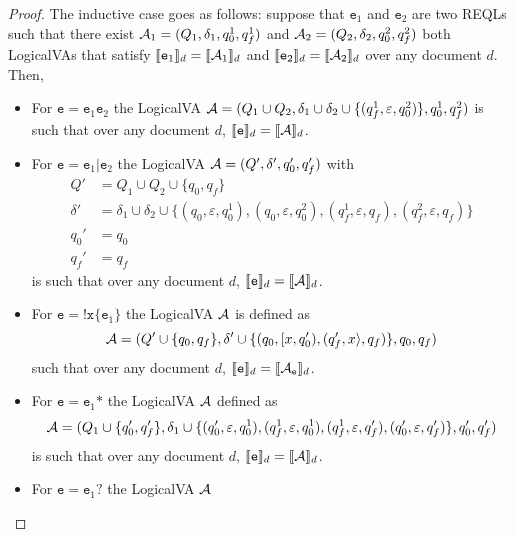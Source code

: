 \begin{proof}
	The inductive case goes as follows: suppose that $\texttt{e}_1$ and
	$\texttt{e}_2$ are two REQLs such that there exist $\mathcal{A}_1 = (Q_1, \delta_1,
	q_0^1, q_f^1)$ and $\mathcal{A}_2 = (Q_2, \delta_2, q_0^2, q_f^2)$ both LogicalVAs
	that satisfy $\llbracket\texttt{e}_1\rrbracket_d = \llbracket\mathcal{A}_1\rrbracket_d$ and
	$\llbracket\texttt{e}_2\rrbracket_d = \llbracket\mathcal{A}_2\rrbracket_d$ over any document $d$. Then,

	\begin{itemize}
		\item For $\texttt{e} = \texttt{e}_1\texttt{e}_2$ the LogicalVA $\mathcal{A} =
			      (Q_1 \cup Q_2, \delta_1 \cup \delta_2 \cup \{(q_f^1,
			      \varepsilon, q_0^2)\}, q_0^1, q_f^2)$ is such that over any
			      document $d$, $\llbracket\texttt{e}\rrbracket_d = \llbracket\mathcal{A}\rrbracket_d$.
		\item For $\texttt{e} = \texttt{e}_1\texttt{|}\texttt{e}_2$ the
		      LogicalVA $\mathcal{A} = (Q', \delta', q_0', q_f')$ with
		      \begin{align*}
			      Q'      & = Q_1 \cup Q_2 \cup \{q_0, q_f\}                                                                                                              \\
			      \delta' & = \delta_1 \cup \delta_2 \cup \{(q_0, \varepsilon, q_0^1), (q_0, \varepsilon, q_0^2), (q_f^1, \varepsilon, q_f), (q_f^2, \varepsilon, q_f) \} \\
			      q_0'    & = q_0                                                                                                                                         \\
			      q_f'    & = q_f
		      \end{align*}
		      is such that over any document $d$, $\llbracket\texttt{e}\rrbracket_d =
			      \llbracket\mathcal{A}\rrbracket_d$.
		\item For $\texttt{e} = \texttt{!x\{}\texttt{e}_1\texttt{\}}$ the
		      LogicalVA $\mathcal{A}$ is defined as
		      \[
			      \mathcal{A} = (Q' \cup \{q_0, q_f\},\delta' \cup \{(q_0, [x, q_0'), (q_f', x\rangle, q_f)\}, q_0, q_f)
		      \]
		      such that over any document $d$, $\llbracket\texttt{e}\rrbracket_d =
			      \llbracket\mathcal{A}_\texttt{e}\rrbracket_d$.
		\item For $\texttt{e} = \texttt{e}_1\texttt{*}$ the LogicalVA $\mathcal{A}$
		      defined as
		      \[
			      \mathcal{A} = (Q_1 \cup \{q_0', q_f'\},
			      \delta_1 \cup \{(q_0', \varepsilon, q_0^1), (q_f^1, \varepsilon, q_0^1), (q_f^1, \varepsilon, q_f'), (q_0', \varepsilon, q_f')\},
			      q_0', q_f')
		      \]
		      is such that over any document $d$, $\llbracket\texttt{e}\rrbracket_d =
			      \llbracket\mathcal{A}\rrbracket_d$.
		\item For $\texttt{e} = \texttt{e}_1\texttt{?}$ the LogicalVA $\mathcal{A}$

\end{itemize}
\end{proof}
